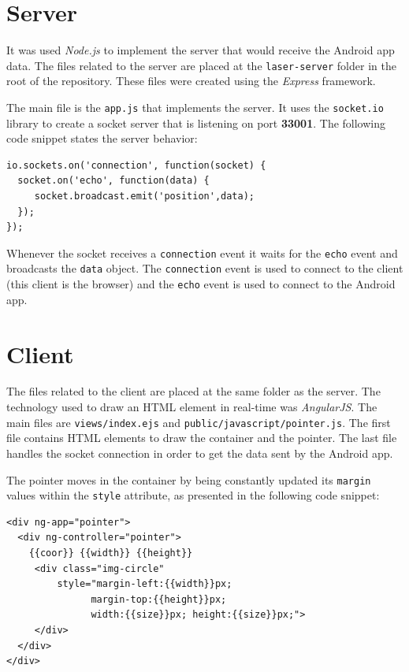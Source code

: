 \documentclass{llncs}
\begin{document}
\section{Server}

It was used \textit{Node.js} to implement the server that would receive the Android app data. The files related to the server are placed at the \texttt{laser-server} folder in the root of the repository. These files were created using the \textit{Express} framework.

The main file is the \texttt{app.js} that implements the server. It uses the \texttt{socket.io} library to create a socket server that is listening on port \textbf{33001}. The following code snippet states the server behavior:

\begin{lstlisting}
io.sockets.on('connection', function(socket) {
  socket.on('echo', function(data) {
     socket.broadcast.emit('position',data);
  });
});
\end{lstlisting}

Whenever the socket receives a \texttt{connection} event it waits for the \texttt{echo} event and broadcasts the \texttt{data} object. The \texttt{connection} event is used to connect to the client (this client is the browser) and the \texttt{echo} event is used to connect to the Android app.

\section{Client}

The files related to the client are placed at the same folder as the server. The technology used to draw an HTML element in real-time was \textit{AngularJS}. The main files are \texttt{views/index.ejs} and \texttt{public/javascript/pointer.js}. The first file contains HTML elements to draw the container and the pointer. The last file handles the socket connection in order to get the data sent by the Android app.

The pointer moves in the container by being constantly updated its \texttt{margin} values within the \texttt{style} attribute, as presented in the following code snippet:

\begin{lstlisting}
<div ng-app="pointer">
  <div ng-controller="pointer">
    {{coor}} {{width}} {{height}}
     <div class="img-circle" 
         style="margin-left:{{width}}px; 
               margin-top:{{height}}px; 
               width:{{size}}px; height:{{size}}px;">
     </div>
  </div>
</div>
\end{lstlisting}
\end{document}
